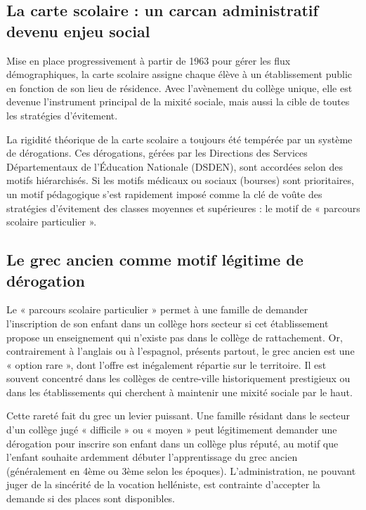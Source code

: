 \subsection{La carte scolaire : un carcan administratif devenu enjeu social}

Mise en place progressivement à partir de 1963 pour gérer les flux démographiques, la carte scolaire
assigne chaque élève à un établissement public en fonction de son lieu de résidence. Avec
l'avènement du collège unique, elle est devenue l'instrument principal de la mixité sociale, mais
aussi la cible de toutes les stratégies d'évitement.\cite{I-3-1-ref5}

La rigidité théorique de la carte scolaire a toujours été tempérée par un système de dérogations.
Ces dérogations, gérées par les Directions des Services Départementaux de l'Éducation Nationale
(DSDEN), sont accordées selon des motifs hiérarchisés. Si les motifs médicaux ou sociaux (bourses)
sont prioritaires, un motif pédagogique s'est rapidement imposé comme la clé de voûte des stratégies
d'évitement des classes moyennes et supérieures : le motif de « parcours scolaire particulier
».\cite{I-3-1-ref5}



\subsection{Le grec ancien comme motif légitime de dérogation}

Le « parcours scolaire particulier » permet à une famille de demander l'inscription de son enfant
dans un collège hors secteur si cet établissement propose un enseignement qui n'existe pas dans le
collège de rattachement. Or, contrairement à l'anglais ou à l'espagnol, présents partout, le grec
ancien est une « option rare », dont l'offre est inégalement répartie sur le territoire. Il est
souvent concentré dans les collèges de centre-ville historiquement prestigieux ou dans les
établissements qui cherchent à maintenir une mixité sociale par le haut.\cite{I-3-1-ref16}

Cette rareté fait du grec un levier puissant. Une famille résidant dans le secteur d'un collège jugé
« difficile » ou « moyen » peut légitimement demander une dérogation pour inscrire son enfant dans
un collège plus réputé, au motif que l'enfant souhaite ardemment débuter l'apprentissage du grec
ancien (généralement en 4ème ou 3ème selon les époques). L'administration, ne pouvant juger de la
sincérité de la vocation helléniste, est contrainte d'accepter la demande si des places sont
disponibles.\cite{I-3-1-ref5}

